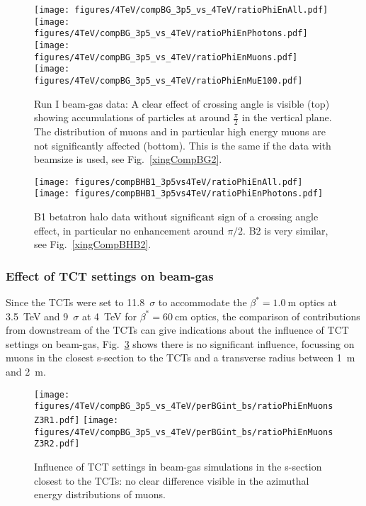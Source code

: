\begin{figure}
\begin{center}
  \texttt{[image: figures/4TeV/compBG\_3p5\_vs\_4TeV/ratioPhiEnAll.pdf]}
  \texttt{[image: figures/4TeV/compBG\_3p5\_vs\_4TeV/ratioPhiEnPhotons.pdf]}
  \texttt{[image: figures/4TeV/compBG\_3p5\_vs\_4TeV/ratioPhiEnMuons.pdf]}
  \texttt{[image: figures/4TeV/compBG\_3p5\_vs\_4TeV/ratioPhiEnMuE100.pdf]}
\end{center}
\vspace{-0.6cm}
 \caption{Run I beam-gas data: A clear effect of crossing angle is visible (top) showing accumulations of particles at around $\frac{\pi}{2}$ in the vertical plane. The distribution of muons and in particular high energy muons are not significantly affected (bottom). This is the same if the data with beamsize is used, see Fig.~\ref{xingCompBG2}.
  \label{xingCompBG}}
\end{figure}


\begin{figure}
\centering
    \texttt{[image: figures/compBHB1\_3p5vs4TeV/ratioPhiEnAll.pdf]}
    \texttt{[image: figures/compBHB1\_3p5vs4TeV/ratioPhiEnPhotons.pdf]}
    \caption{B1 betatron halo data without significant sign of a crossing angle effect, in particular no enhancement around $\pi/2$. B2 is very similar, see Fig.~\ref{xingCompBHB2}.
      \label{xingCompBHB1}
      }
\end{figure}

\subsubsection{Effect of TCT settings on beam-gas}

Since the TCTs were set to 11.8~$\sigma$ to accommodate the $\beta^* = 1.0~$m optics at 3.5~TeV and 9~$\sigma$ at 4~TeV for $\beta^* = 60~$cm optics, the comparison of contributions from downstream of the TCTs can give indications about the influence of TCT settings on beam-gas, Fig.~\ref{compBGrun1} shows there is no significant influence, focussing on muons in the closest s-section to the TCTs and a transverse radius between 1~m and 2~m.

\begin{figure}
  \centering
  \texttt{[image: figures/4TeV/compBG\_3p5\_vs\_4TeV/perBGint\_bs/ratioPhiEnMuonsZ3R1.pdf]}
  \texttt{[image: figures/4TeV/compBG\_3p5\_vs\_4TeV/perBGint\_bs/ratioPhiEnMuonsZ3R2.pdf]}
  \caption{Influence of TCT settings in beam-gas simulations in the s-section closest to the TCTs: no clear difference visible in the azimuthal energy distributions of muons.
  \label{compBGrun1}}
\end{figure}

